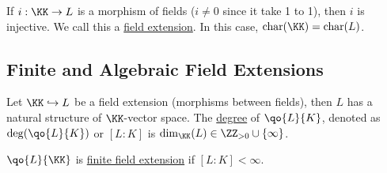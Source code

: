 \begin{remark}
	If \( i: \KK \to L \) is a morphism of fields (\( i\ne 0 \) since it take 1 to 1), then \( i \) is
	injective. We call this a \underline{field extension}. In this case, \( \text{char}(\KK) = \text{char}(L)\).
\end{remark}

\subsection{Finite and Algebraic Field Extensions}
Let \( \KK \hookrightarrow L \) be a field extension (morphisms between fields), then \( L \) has a
natural structure of \( \KK \)-vector space. The \underline{degree} of \( \qo{L}{K} \), denoted as \( \deg(\qo{L}{K}) \) or \( [L:K] \) is \( \dim_\KK(L) \in \ZZ_{>0}
\cup\{\infty\} \).

\begin{definition}
	\( \qo{L}{\KK} \) is \underline{finite field extension} if \( [L:K] < \infty \).
\end{definition}


